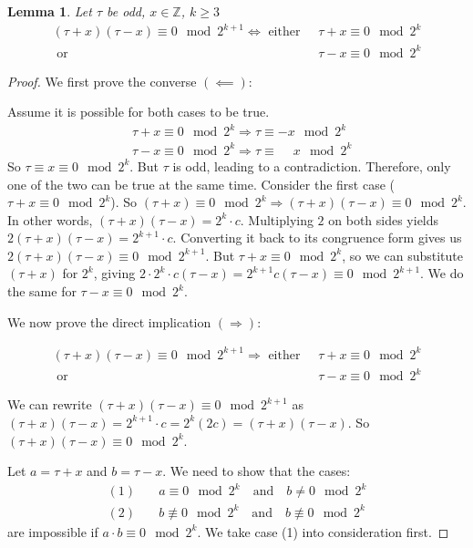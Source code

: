 \documentclass{amsart}
\theoremstyle{plain}
\newtheorem{lemma}{Lemma}
\renewcommand{\implies}{\Rightarrow}
\begin{document}
\begin{lemma}\label{lemma-2}
  Let $\tau$ be odd, $x\in\mathbb{Z}$, $k\geq 3$
  \begin{align*}
    (\tau+x)(\tau-x)\equiv 0\mod 2^{k+1}\iff\text{ either }\;&\tau+x\equiv 0\mod 2^k\\
                                            \text{ or }\;&\tau-x\equiv 0\mod 2^k
  \end{align*}
\end{lemma}
\begin{proof}
  We first prove the converse $(\impliedby)$:

  Assume it is possible for both cases to be true.
  \begin{align*}
    &\tau+x\equiv 0\mod 2^k\implies\tau\equiv -x\mod 2^k\\
    &\tau-x\equiv 0\mod 2^k\implies\tau\equiv \phantom{-}x\mod 2^k
  \end{align*}
  So $\tau\equiv x\equiv 0\mod 2^k$. But $\tau$ is odd, leading to a contradiction. Therefore, only
  one of the two can be true at the same time. Consider the first case ($\tau+x\equiv 0\mod 2^k$).
  So $(\tau+x)\equiv 0\mod 2^k\implies(\tau+x)(\tau-x)\equiv 0\mod 2^k$. In other words,
  $(\tau+x)(\tau-x)= 2^k \cdot c$. Multiplying $2$ on both sides yields $2(\tau+x)(\tau-x)
  =2^{k+1}\cdot c$. Converting it back to its congruence form gives us $2(\tau+x)(\tau-x)\equiv
  0\mod 2^{k+1}$. But $\tau+x\equiv 0\mod 2^k$, so we can substitute $(\tau+x)$ for $2^k$, giving
  $2\cdot 2^k\cdot c(\tau-x)=2^{k+1}c(\tau-x)\equiv 0\mod 2^{k+ 1}$.  We do the same for
  $\tau-x\equiv 0\mod 2^k$.

  We now prove the direct implication $(\implies)$:

  \begin{align*}
    (\tau+x)(\tau-x)\equiv 0\mod 2^{k+1}\implies\text{ either }\;&\tau+x\equiv 0\mod 2^k\\
                                            \text{ or }\;&\tau-x\equiv 0\mod 2^k
  \end{align*}

  We can rewrite $(\tau+x)(\tau-x)\equiv 0\mod 2^{k+1}$ as $(\tau+x)(\tau-x)=2^{k+1}\cdot c=2^k(2c)
  =(\tau+x)(\tau-x)$. So $(\tau+x)(\tau-x)\equiv 0\mod 2^k$.

  Let $a=\tau+x$ and $b=\tau-x$. We need to show that the cases:
  \begin{align*}
    (1) \quad &a\equiv 0\mod 2^k\quad\text{and}\quad b\neq 0\mod 2^k\\
    (2) \quad &b\not\equiv 0\mod 2^k\quad\text{and}\quad b\not\equiv 0\mod 2^k
  \end{align*}
  are impossible if $a\cdot b\equiv 0\mod 2^k$. We take case (1) into consideration first.


\end{proof}
\end{document}
